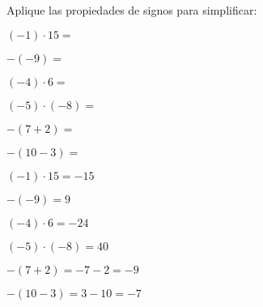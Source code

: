\begin{exercise}
\problem Aplique las propiedades de signos para simplificar:

\begin{exerciselist}
    \item $(-1) \cdot 15 = $ \underline{\hspace{3cm}}
    \item $-(-9) = $ \underline{\hspace{3cm}}
    \item $(-4) \cdot 6 = $ \underline{\hspace{3cm}}
    \item $(-5) \cdot (-8) = $ \underline{\hspace{3cm}}
    \item $-(7 + 2) = $ \underline{\hspace{3cm}}
    \item $-(10 - 3) = $ \underline{\hspace{3cm}}
\end{exerciselist}

\begin{solucion}
\begin{exerciselist}
    \item $(-1) \cdot 15 = -15$
    \item $-(-9) = 9$
    \item $(-4) \cdot 6 = -24$
    \item $(-5) \cdot (-8) = 40$
    \item $-(7 + 2) = -7 - 2 = -9$
    \item $-(10 - 3) = 3 - 10 = -7$
\end{exerciselist}
\end{solucion}
\end{exercise}

